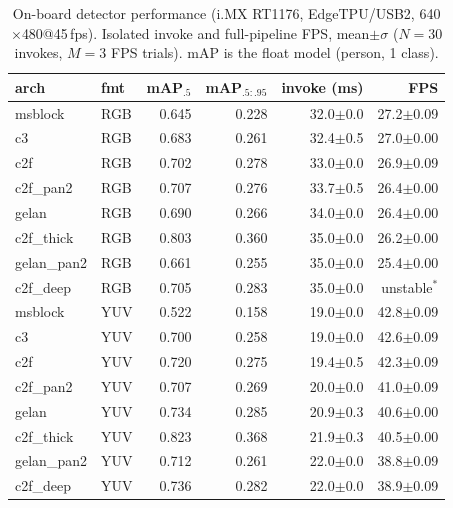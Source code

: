 \begin{table}[t]\centering
\caption{On-board detector performance (i.MX RT1176, EdgeTPU/USB2, 640$\times$480@45\,fps). Isolated invoke and full-pipeline FPS, mean$\pm\sigma$ ($N{=}30$ invokes, $M{=}3$ FPS trials). mAP is the float model (person, 1 class).}
\label{tab:s241}
\begin{tabular}{llrrrr}
\toprule
arch & fmt & mAP$_{.5}$ & mAP$_{.5:.95}$ & invoke (ms) & FPS \\
\midrule
msblock & RGB & 0.645 & 0.228 & 32.0$\pm$0.0 & 27.2$\pm$0.09 \\
c3 & RGB & 0.683 & 0.261 & 32.4$\pm$0.5 & 27.0$\pm$0.00 \\
c2f & RGB & 0.702 & 0.278 & 33.0$\pm$0.0 & 26.9$\pm$0.09 \\
c2f\_pan2 & RGB & 0.707 & 0.276 & 33.7$\pm$0.5 & 26.4$\pm$0.00 \\
gelan & RGB & 0.690 & 0.266 & 34.0$\pm$0.0 & 26.4$\pm$0.00 \\
c2f\_thick & RGB & 0.803 & 0.360 & 35.0$\pm$0.0 & 26.2$\pm$0.00 \\
gelan\_pan2 & RGB & 0.661 & 0.255 & 35.0$\pm$0.0 & 25.4$\pm$0.00 \\
c2f\_deep & RGB & 0.705 & 0.283 & 35.0$\pm$0.0 & unstable$^{*}$ \\
\midrule
msblock & YUV & 0.522 & 0.158 & 19.0$\pm$0.0 & 42.8$\pm$0.09 \\
c3 & YUV & 0.700 & 0.258 & 19.0$\pm$0.0 & 42.6$\pm$0.09 \\
c2f & YUV & 0.720 & 0.275 & 19.4$\pm$0.5 & 42.3$\pm$0.09 \\
c2f\_pan2 & YUV & 0.707 & 0.269 & 20.0$\pm$0.0 & 41.0$\pm$0.09 \\
gelan & YUV & 0.734 & 0.285 & 20.9$\pm$0.3 & 40.6$\pm$0.00 \\
c2f\_thick & YUV & 0.823 & 0.368 & 21.9$\pm$0.3 & 40.5$\pm$0.00 \\
gelan\_pan2 & YUV & 0.712 & 0.261 & 22.0$\pm$0.0 & 38.8$\pm$0.09 \\
c2f\_deep & YUV & 0.736 & 0.282 & 22.0$\pm$0.0 & 38.9$\pm$0.09 \\
\bottomrule
\end{tabular}
\end{table}
